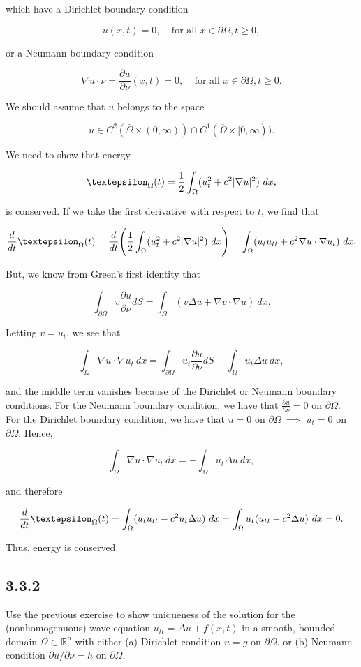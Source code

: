 \documentclass{article}
\begin{document}
which have a Dirichlet boundary condition

$$u(x,t)=0, ~~~~~\text{for all $x\in\partial\Omega,t\geq 0$},$$

or a Neumann boundary condition

$$\nabla u \cdot \nu = \frac{\partial u}{\partial \nu}(x,t)=0,~~~~~\text{for all $x\in\partial\Omega,t\geq 0$}.$$

We should assume that $u$ belongs to the space

$$u\in C^2(\overline{\Omega}\times(0,\infty))\cap C^1(\overline{\Omega}\times[0,\infty)).$$

We need to show that energy 

$$\textepsilon_{\Omega}(t)=\frac{1}{2}\int_{\Omega}(u_t^2+c^2|\nabla u|^2) ~dx,$$

is conserved. If we take the first derivative with respect to $t$, we find that

$$\frac{d}{dt}\textepsilon_{\Omega}(t)=\frac{d}{dt}\Bigg(\frac{1}{2}\int_{\Omega}(u_t^2+c^2|\nabla u|^2) ~dx\Bigg) =\int_{\Omega}(u_tu_{tt}+c^2\nabla u \cdot \nabla u_t)~ dx.$$

But, we know from Green's first identity that

$$\int_{\partial\Omega}v\frac{\partial u}{\partial \nu}dS = \int_{\Omega}(v \Delta u + \nabla v \cdot \nabla u)~dx.$$

Letting $v=u_t$, we see that

$$\int_{\Omega}\nabla u \cdot \nabla u_t ~dx = \int_{\partial\Omega}u_t\frac{\partial u}{\partial \nu}dS - \int_{\Omega}u_t\Delta u~ dx,$$

and the middle term vanishes because of the Dirichlet or Neumann boundary conditions. For the Neumann boundary condition, we have that $\frac{\partial u}{\partial \nu}=0$ on $\partial\Omega$. For the Dirichlet boundary condition, we have that $u=0$ on $\partial\Omega ~\implies$ $u_t=0$ on $\partial\Omega$. Hence, 

$$\int_{\Omega}\nabla u \cdot \nabla u_t ~dx =  - \int_{\Omega}u_t\Delta u~ dx,$$

and therefore

$$\frac{d}{dt}\textepsilon_{\Omega}(t)=\int_{\Omega}(u_tu_{tt}-c^2u_t\Delta u) ~dx= \int_{\Omega}u_t(u_{tt}-c^2\Delta u)~ dx=0.$$

Thus, energy is conserved.

\subsection{\textbf{3.3.2}} Use the previous exercise to show uniqueness of the solution for the (nonhomogenuous) wave equation $u_{tt}=\Delta u + f(x,t)$ in a smooth, bounded domain $\Omega\subset\mathbb R^n$ with either (a) Dirichlet condition $u=g$ on $\partial\Omega$, or (b) Neumann condition $\partial u/\partial \nu=h$ on $\partial\Omega$.
\end{document}
